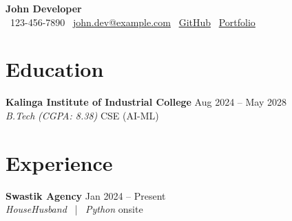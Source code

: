 \titlespacing*{\section}{0pt}{10pt}{4pt}

\pagestyle{empty}


\setlength{\parindent}{0pt}

\usepackage{tfrupee}
\usepackage{newunicodechar}



\begin{center}
    {\LARGE\bfseries John Developer}\\[5pt]
    \small
        \Mobilefone\ 123-456-7890%
         \quad %
        \Letter\ \href{mailto:john.dev@example.com}{john.dev@example.com}%
        \quad \textbullet\ \href{https://github.com/johndev}{GitHub}%
        \quad \textbullet\ \href{https://example.com}{Portfolio}%
    
\end{center}

\vspace{-4pt}


%
\section{Education}
%
\textbf{Kalinga Institute of Industrial College} \hfill Aug 2024 -- May 2028 \\
\textit{B.Tech} \textit{(CGPA: 8.38)}%
%
 \hfill CSE (AI-ML)%
%
%
%



%
\section{Experience}
%
\textbf{Swastik Agency} \hfill Jan 2024 -- Present \\
\textit{HouseHusband} \ | \ \textit{Python}%
%
 \hfill onsite%
%

